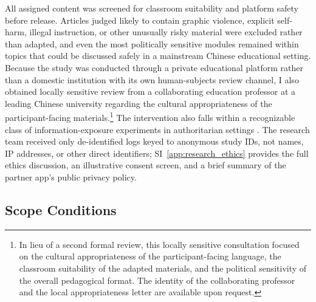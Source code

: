 \documentclass[12pt,american]{article}
\begin{document}
All assigned content was screened for classroom suitability and platform safety before release. Articles judged likely to contain graphic violence, explicit self-harm, illegal instruction, or other unusually risky material were excluded rather than adapted, and even the most politically sensitive modules remained within topics that could be discussed safely in a mainstream Chinese educational setting. Because the study was conducted through a private educational platform rather than a domestic institution with its own human-subjects review channel, I also obtained locally sensitive review from a collaborating education professor at a leading Chinese university regarding the cultural appropriateness of the participant-facing materials.\footnote{In lieu of a second formal review, this locally sensitive consultation focused on the cultural appropriateness of the participant-facing language, the classroom suitability of the adapted materials, and the political sensitivity of the overall pedagogical format. The identity of the collaborating professor and the local appropriateness letter are available upon request.} The intervention also falls within a recognizable class of information-exposure experiments in authoritarian settings \citep{chenyang2019,huang2017misinformation,shen2025forced}. The research team received only de-identified logs keyed to anonymous study IDs, not names, IP addresses, or other direct identifiers; SI~\ref{app:research_ethics} provides the full ethics discussion, an illustrative consent screen, and a brief summary of the partner app's public privacy policy.

	\subsection*{Scope Conditions}
\end{document}

